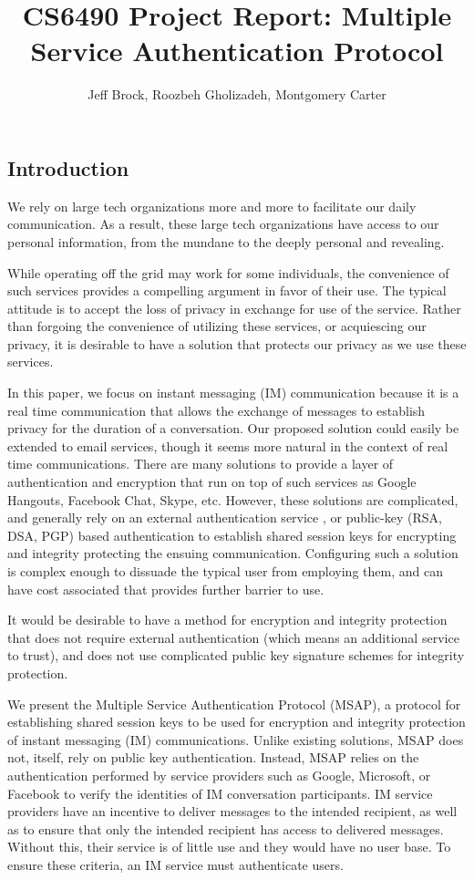 \documentclass[twoside,10pt]{article}
\title{CS6490 Project Report: Multiple Service Authentication Protocol}
\author{Jeff Brock, Roozbeh Gholizadeh, Montgomery Carter}
\date{}
\begin{document}
\maketitle
\newpage
\begin{multicols}{2}

\section{Introduction}
We rely on large tech organizations more and more to facilitate our daily communication.  As a result, these large tech organizations have access to our personal information, from the mundane to the deeply personal and revealing.

While operating off the grid may work for some individuals, the convenience of such services provides a compelling argument in favor of their use.  The typical attitude is to accept the loss of privacy in exchange for use of the service.  Rather than forgoing the convenience of utilizing these services, or acquiescing our privacy, it is desirable to have a solution that protects our privacy as we use these services.

In this paper, we focus on instant messaging (IM) communication because it is a real time communication that allows the exchange of messages to establish privacy for the duration of a conversation.  Our proposed solution could easily be extended to email services, though it seems more natural in the context of real time communications.  There are many solutions to provide a layer of authentication and encryption that run on top of such services as Google Hangouts, Facebook Chat, Skype, etc.  However, these solutions are complicated, and generally rely on an external authentication service \cite{DiRaimondo:2005:SOM:1102199.1102216}, or public-key (RSA, DSA, PGP) based authentication to establish shared session keys for encrypting and integrity protecting the ensuing communication.  Configuring such a solution is complex enough to dissuade the typical user from employing them, and can have cost associated that provides further barrier to use.

It would be desirable to have a method for encryption and integrity protection that does not require external authentication (which means an additional service to trust), and does not use complicated public key signature schemes for integrity protection.

We present the Multiple Service Authentication Protocol (MSAP), a protocol for establishing shared session keys to be used for encryption and integrity protection of instant messaging (IM) communications. Unlike existing solutions, MSAP does not, itself, rely on public key authentication.  Instead, MSAP relies on the authentication performed by service providers such as Google, Microsoft, or Facebook to verify the identities of IM conversation participants.  IM service providers have an incentive to deliver messages to the intended recipient, as well as to ensure that only the intended recipient has access to delivered messages.  Without this, their service is of little use and they would have no user base.  To ensure these criteria, an IM service must authenticate users.


\end{multicols}
\end{document}
